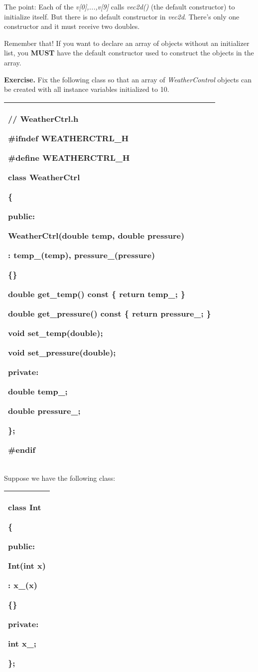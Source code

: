 \documentclass[
]{article}
\begin{document}
The point: Each of the \emph{v{[}0{]},...,v{[}9{]}} calls \emph{vec2d()}
(the default constructor) to initialize itself. But there is no default
constructor in \emph{vec2d}. There's only one constructor and it must
receive two doubles.

Remember that! If you want to declare an array of objects without an
initializer list, you \textbf{MUST} have the default constructor used to
construct the objects in the array.

\textbf{Exercise. }Fix the following class so that an array of
\emph{WeatherControl} objects can be created with all instance variables
initialized to 10.

\begin{longtable}[]{@{}l@{}}
\toprule
\endhead
\begin{minipage}[t]{0.97\columnwidth}\raggedright
// WeatherCtrl.h

\#ifndef WEATHERCTRL\_H

\#define WEATHERCTRL\_H

class WeatherCtrl

\{

public:

WeatherCtrl(double temp, double pressure)

: temp\_(temp), pressure\_(pressure)

\{\}

double get\_temp() const \{ return temp\_; \}

double get\_pressure() const \{ return pressure\_; \}

void set\_temp(double);

void set\_pressure(double);

private:

double temp\_;

double pressure\_;

\};

\#endif\strut
\end{minipage}\tabularnewline
\bottomrule
\end{longtable}

Suppose we have the following class:

\begin{longtable}[]{@{}l@{}}
\toprule
\endhead
\begin{minipage}[t]{0.97\columnwidth}\raggedright
class Int

\{

public:

Int(int x)

: x\_(x)

\{\}

private:

int x\_;

\};\strut
\end{minipage}\tabularnewline
\bottomrule
\end{longtable}
\end{document}
